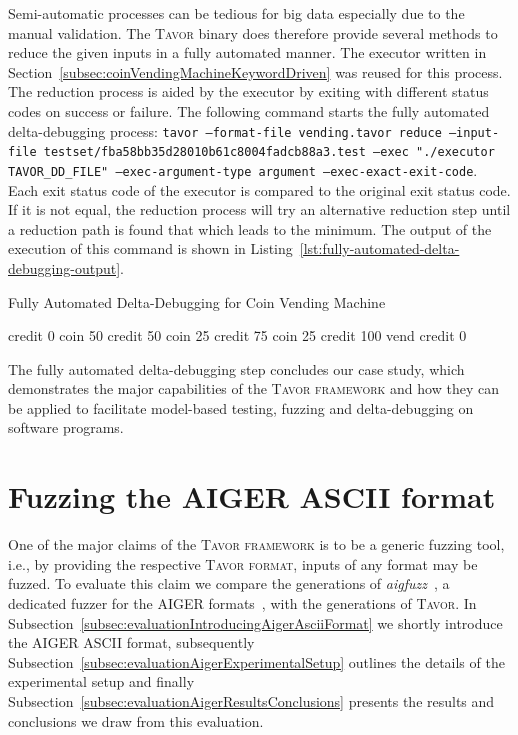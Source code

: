 Semi-automatic processes can be tedious for big data especially due to the manual validation. The \textsc{Tavor} binary does therefore provide several methods to reduce the given inputs in a fully automated manner. The executor written in Section~\ref{subsec:coinVendingMachineKeywordDriven} was reused for this process. The reduction process is aided by the executor by exiting with different status codes on success or failure. The following command starts the fully automated delta-debugging process: \texttt{tavor --format-file vending.tavor reduce --input-file testset/fba58bb35d28010b61c8004fadcb88a3.test --exec "./executor TAVOR\_DD\_FILE" --exec-argument-type argument --exec-exact-exit-code}. Each exit status code of the executor is compared to the original exit status code. If it is not equal, the reduction process will try an alternative reduction step until a reduction path is found that which leads to the minimum. The output of the execution of this command is shown in Listing~\ref{lst:fully-automated-delta-debugging-output}.

\begin{listing}
\caption{Fully Automated Delta-Debugging for Coin Vending Machine}
\label{lst:fully-automated-delta-debugging-output}
\begin{textcode}
credit  0
coin    50
credit  50
coin    25
credit  75
coin    25
credit  100
vend
credit  0
\end{textcode}
\end{listing}

The fully automated delta-debugging step concludes our case study, which demonstrates the major capabilities of the \textsc{Tavor framework} and how they can be applied to facilitate model-based testing, fuzzing and delta-debugging on software programs.

\afterpage{\clearpage}

\section{Fuzzing the AIGER ASCII format}
\label{sec:evaluationFuzzingAigerAscii}

One of the major claims of the \textsc{Tavor framework} is to be a generic fuzzing tool, i.e., by providing the respective \textsc{Tavor format}, inputs of any format may be fuzzed. To evaluate this claim we compare the generations of \emph{aigfuzz}~\cite{2017_aig_fuzz}, a dedicated fuzzer for the AIGER formats~\cite{biere2007aiger}, with the generations of \textsc{Tavor}. In Subsection~\ref{subsec:evaluationIntroducingAigerAsciiFormat} we shortly introduce the AIGER ASCII format, subsequently Subsection~\ref{subsec:evaluationAigerExperimentalSetup} outlines the details of the experimental setup and finally Subsection~\ref{subsec:evaluationAigerResultsConclusions} presents the results and conclusions we draw from this evaluation.

